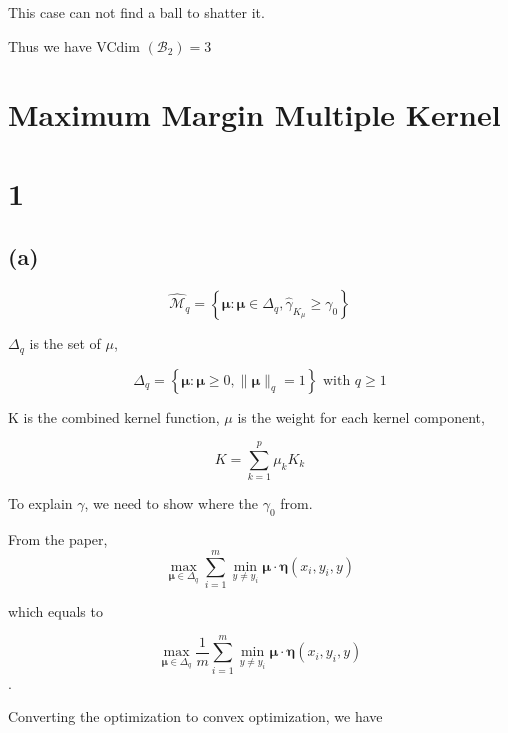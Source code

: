 \documentclass{article}
\begin{document}
This case can not find a ball to shatter it.

Thus we have VCdim $\left(\mathcal{B}_{2}\right) = 3$

\section*{Maximum Margin Multiple Kernel}
\section*{1}
\subsection*{(a)}

\begin{equation}
    \widehat{\mathcal{M}}_{q}=\left\{\boldsymbol{\mu}: \boldsymbol{\mu} \in \Delta_{q}, \widehat{\gamma}_{K_{\mu}} \geq \gamma_{0}\right\}
\end{equation}

$\Delta_q$ is the set of $\mu$,

\begin{equation}
    \Delta_{q}=\left\{\boldsymbol{\mu}: \boldsymbol{\mu} \geq 0,\|\boldsymbol{\mu}\|_{q}=1\right\} \text { with } q \geq 1
\end{equation}

K is the combined kernel function, $\mu$ is the weight for each kernel component,

\begin{equation}
    K = \sum_{k=1}^{p} \mu_{k} K_{k}
\end{equation}

To explain $\gamma$, we need to show where the $\gamma_0$ from.

From the paper,
\begin{equation}
    \max _{\boldsymbol{\mu} \in \Delta_{q}} \sum_{i=1}^{m} \min _{y \neq y_{i}} \boldsymbol{\mu} \cdot \boldsymbol{\eta}\left(x_{i}, y_{i}, y\right)
\end{equation}

which equals to 

\begin{equation}
    \max _{\boldsymbol{\mu} \in \Delta_{q}} \frac{1}{m} \sum_{i=1}^{m} \min _{y \neq y_{i}} \boldsymbol{\mu} \cdot \boldsymbol{\eta}\left(x_{i}, y_{i}, y\right)
 \end{equation}.

Converting the optimization to convex optimization, we have
\end{document}
